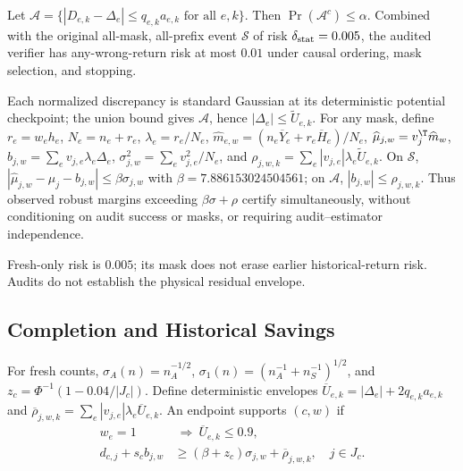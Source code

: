 \begin{proposition}
\label{prop:v37-audit-validity}
Let $\mathcal A=\{|D_{e,k}-\Delta_e|\leq q_{e,k}a_{e,k}\text{ for all }e,k\}$. Then $\Pr(\mathcal A^c)\leq\alpha$. Combined with the original all-mask, all-prefix event $\mathcal S$ of risk $\delta_{\rm stat}=0.005$, the audited verifier has any-wrong-return risk at most $0.01$ under causal ordering, mask selection, and stopping.
\end{proposition}
\begin{IEEEproof}
Each normalized discrepancy is standard Gaussian at its deterministic potential checkpoint; the union bound gives $\mathcal A$, hence $|\Delta_e|\leq\widetilde U_{e,k}$. For any mask, define $r_e=w_eh_e$, $N_e=n_e+r_e$, $\lambda_e=r_e/N_e$, $\widehat m_{e,w}=(n_e\overline Y_e+r_e\overline H_e)/N_e$, $\widehat\mu_{j,w}=v_j^\T\widehat m_w$, $b_{j,w}=\sum_ev_{j,e}\lambda_e\Delta_e$, $\sigma_{j,w}^2=\sum_ev_{j,e}^2/N_e$, and $\rho_{j,w,k}=\sum_e|v_{j,e}|\lambda_e\widetilde U_{e,k}$.
On $\mathcal S$, $|\widehat\mu_{j,w}-\mu_j-b_{j,w}|\leq\beta\sigma_{j,w}$ with $\beta=7.886153024504561$; on $\mathcal A$, $|b_{j,w}|\leq\rho_{j,w,k}$. Thus observed robust margins exceeding $\beta\sigma+\rho$ certify simultaneously, without conditioning on audit success or masks, or requiring audit--estimator independence.
\end{IEEEproof}
Fresh-only risk is $0.005$; its mask does not erase earlier historical-return risk. Audits do not establish the physical residual envelope.

\subsection{Completion and Historical Savings}
For fresh counts, $\sigma_A(n)=n_A^{-1/2}$, $\sigma_1(n)=(n_A^{-1}+n_S^{-1})^{1/2}$, and $z_c=\Phi^{-1}(1-0.04/|J_c|)$. Define deterministic envelopes $\overline U_{e,k}=|\Delta_e|+2q_{e,k}a_{e,k}$ and $\overline\rho_{j,w,k}=\sum_e|v_{j,e}|\lambda_e\overline U_{e,k}$. An endpoint supports $(c,w)$ if
\begin{align}
w_e=1&\ \Longrightarrow\ \overline U_{e,k}\leq0.9,\nonumber\\
d_{c,j}+s_cb_{j,w}&\geq(\beta+z_c)\sigma_{j,w}+\overline\rho_{j,w,k},
\quad j\in J_c.
\label{eq:v37-audited-endpoint}
\end{align}

